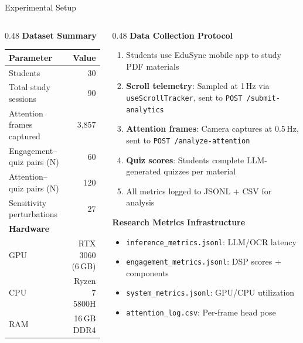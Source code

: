 \documentclass[aspectratio=169,10pt]{beamer}
\begin{document}
\begin{frame}{Experimental Setup}
\begin{columns}[T]
\begin{column}{0.48\textwidth}
\textbf{Dataset Summary}

\vspace{4pt}
\footnotesize
\begin{tabular}{@{}lr@{}}
\toprule
\textbf{Parameter} & \textbf{Value} \\
\midrule
Students & 30 \\
Total study sessions & 90 \\
Attention frames captured & 3{,}857 \\
Engagement--quiz pairs (N) & 60 \\
Attention--quiz pairs (N) & 120 \\
Sensitivity perturbations & 27 \\
\midrule
\textbf{Hardware} & \\
\midrule
GPU & RTX 3060 (6\,GB) \\
CPU & Ryzen 7 5800H \\
RAM & 16\,GB DDR4 \\
\bottomrule
\end{tabular}
\end{column}

\begin{column}{0.48\textwidth}
\textbf{Data Collection Protocol}

\vspace{4pt}
\footnotesize
\begin{enumerate}\scriptsize
  \item Students use EduSync mobile app to study PDF materials
  \item \textbf{Scroll telemetry}: Sampled at 1\,Hz via \texttt{useScrollTracker}, sent to \texttt{POST /submit-analytics}
  \item \textbf{Attention frames}: Camera captures at 0.5\,Hz, sent to \texttt{POST /analyze-attention}
  \item \textbf{Quiz scores}: Students complete LLM-generated quizzes per material
  \item All metrics logged to JSONL + CSV for analysis
\end{enumerate}

\vspace{6pt}
\textbf{Research Metrics Infrastructure}
\begin{itemize}\scriptsize
  \item \texttt{inference\_metrics.jsonl}: LLM/OCR latency
  \item \texttt{engagement\_metrics.jsonl}: DSP scores + components
  \item \texttt{system\_metrics.jsonl}: GPU/CPU utilization
  \item \texttt{attention\_log.csv}: Per-frame head pose
\end{itemize}
\end{column}
\end{columns}
\end{frame}
\end{document}
